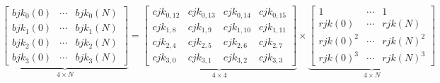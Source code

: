 \documentclass[12pt]{article}
\begin{document}
{$$
\underbrace{\begin{bmatrix}
bjk_0(0) & \cdots & bjk_0(N)\\
bjk_1(0) & \cdots & bjk_1(N)\\
bjk_2(0) & \cdots & bjk_2(N)\\
bjk_3(0) & \cdots & bjk_3(N)
\end{bmatrix}}_{4\times N}
=
\underbrace{\begin{bmatrix}
cjk_{0,12} & cjk_{0,13} & cjk_{0,14} & cjk_{0,15} \\
cjk_{1,8 } & cjk_{1,9 } & cjk_{1,10} & cjk_{1,11}\\
cjk_{2,4 } & cjk_{2,5 } & cjk_{2,6 } & cjk_{2,7 }\\
cjk_{3,0 } & cjk_{3,1 } & cjk_{3,2 } & cjk_{3,3 }
\end{bmatrix}}_{4\times 4}
\times
\underbrace{\begin{bmatrix}
1        & \cdots & 1                   \\
rjk(0)   & \cdots & rjk(N)   \\
rjk(0)^2 & \cdots & rjk(N)^2 \\
rjk(0)^3 & \cdots & rjk(N)^3
\end{bmatrix}}_{4\times N}
$$
}



\clearpage
\end{document}
